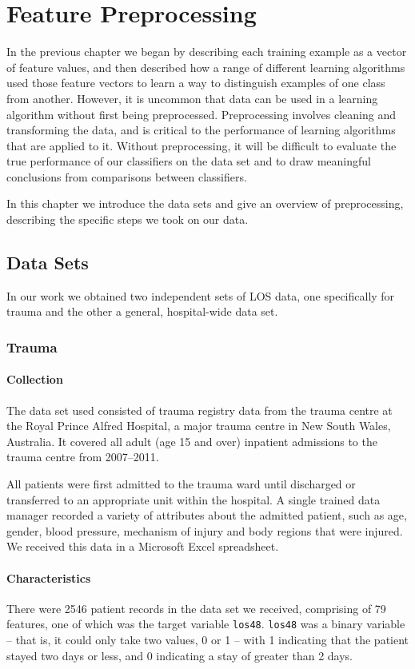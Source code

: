 \chapter{Feature Preprocessing} \label{chap:preprocess}

In the previous chapter we began by describing each training example as a
vector of feature values, and then described how a range of different
learning algorithms used those feature vectors to learn a way to
distinguish examples of one class from another. However, it is uncommon that
data can be used in a learning algorithm without first being preprocessed.
Preprocessing involves cleaning and transforming the data, and is critical
to the performance of learning algorithms that are applied to it. Without
preprocessing, it will be difficult to evaluate the true performance of
our classifiers on the data set and to draw meaningful conclusions from
comparisons between classifiers.

In this chapter we introduce the data sets and give an overview of
preprocessing, describing the specific steps we took on our data.

\section{Data Sets}
In our work we obtained two independent sets of LOS data, one specifically for
trauma and the other a general, hospital-wide data set.

\subsection{Trauma}
\subsubsection{Collection}
The data set used consisted of trauma registry data from the trauma centre
at the Royal Prince Alfred Hospital, a major trauma centre in New South Wales,
Australia. It covered all adult (age 15 and over) inpatient admissions to the
trauma centre from 2007--2011. 

All patients were first admitted to the trauma ward until discharged
or transferred to an appropriate unit within the hospital. A single trained
data manager recorded a variety of attributes about the admitted patient,
such as age, gender, blood pressure, mechanism of injury and body regions
that were injured. We received this data in a Microsoft Excel spreadsheet.

\subsubsection{Characteristics}
There were 2546 patient records in the data set we received, comprising of 79
features, one of which was the target variable \texttt{los48}.
\texttt{los48} was a binary variable -- that is, it could only take two
values, 0 or 1 -- with 1 indicating that the patient stayed two days or less,
and 0 indicating a stay of greater than 2 days.

